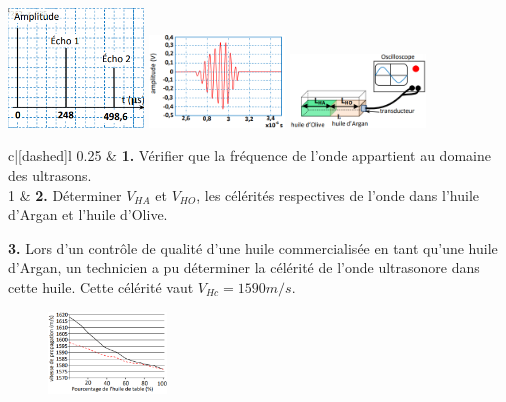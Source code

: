 \documentclass[12pt]{article}
\begin{document}
\begin{center}
  \includegraphics[width=0.27\textwidth]{./img/phys00.png}
  \includegraphics[width=0.27\textwidth]{./img/phys01.png}
  \includegraphics[width=0.27\textwidth]{./img/phys02.png}
\end{center}

\begin{tblr}{c|[dashed]l}
	0.25  & \textbf{1. }Vérifier que la fréquence de l’onde appartient au domaine des ultrasons. \\
  1 & \textbf{2. }Déterminer $V_{HA}$ et $V_{HO}$, les célérités respectives de l’onde dans l’huile d’Argan et l’huile d’Olive. \\
	\end{tblr}
\textbf{3. }Lors d’un contrôle de qualité d’une huile commercialisée en tant
qu’une huile d’Argan, un technicien a pu déterminer la célérité de
l’onde ultrasonore dans cette huile.
Cette célérité vaut $V_{Hc} = 1590 m/s.$  

\begin{figure}
  \vspace{0.5cm}
\begin{center}
  \includegraphics[width=0.28\textwidth]{./img/phys03.png}
\end{center}
\end{figure}
\end{document}
